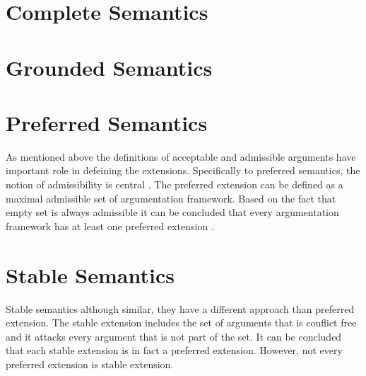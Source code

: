 \section{Complete Semantics}


\section{Grounded Semantics}

\section{Preferred Semantics} 
As mentioned above the definitions of acceptable and admissible arguments have important role in defeining the extensions. Specifically to preferred semantics, the notion of admissibility is central \cite{caminada2008gentle}. The preferred extension can be defined as a maximal admissible set of argumentation framework. Based on the fact that empty set is always admissible it can be concluded that every argumentation framework has at least one preferred extension \cite{dung1995}.

\section{Stable Semantics} 
Stable semantics although similar, they have a different approach than preferred extension. The stable extension includes the set of arguments that is conflict free and it attacks every argument that is not part of the set. It can be concluded that each stable extension is in fact a preferred extension. However, not every preferred extension is stable extension.



